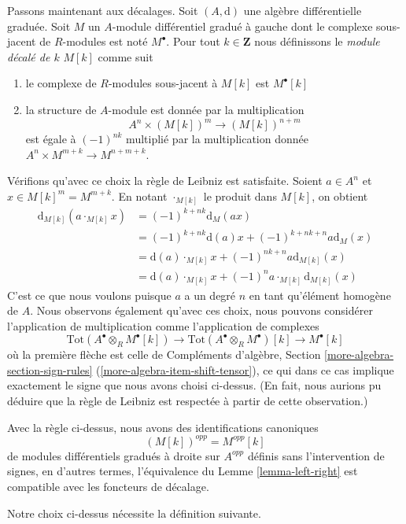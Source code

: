 \noindent
Passons maintenant aux décalages. Soit $(A, \text{d})$ une algèbre différentielle
graduée. Soit $M$ un $A$-module différentiel gradué à gauche dont le complexe
sous-jacent de $R$-modules est noté $M^\bullet$. Pour tout $k \in \mathbf{Z}$ nous
définissons le {\it module décalé de $k$} $M[k]$ comme suit
\begin{enumerate}
\item le complexe de $R$-modules sous-jacent à $M[k]$ est $M^\bullet[k]$
\item la structure de $A$-module est donnée par la multiplication
$$
A^n \times (M[k])^m \longrightarrow (M[k])^{n + m}
$$
est égale à $(-1)^{nk}$ multiplié par la multiplication donnée $A^n \times M^{m +
k} \to M^{n + m + k}$.
\end{enumerate}
Vérifions qu'avec ce choix la règle de Leibniz est satisfaite. Soient $a \in
A^n$ et $x \in M[k]^m = M^{m + k}$. En notant $\cdot_{M[k]}$ le produit dans
$M[k]$, on obtient
\begin{align*}
\text{d}_{M[k]}(a \cdot_{M[k]} x)
& =
(-1)^{k + nk} \text{d}_M(ax) \\
& =
(-1)^{k + nk} \text{d}(a) x + (-1)^{k + nk + n} a \text{d}_M(x) \\
& =
\text{d}(a) \cdot_{M[k]} x + (-1)^{nk + n} a \text{d}_{M[k]}(x) \\
& =
\text{d}(a) \cdot_{M[k]} x + (-1)^n a \cdot_{M[k]} \text{d}_{M[k]}(x)
\end{align*}
C'est ce que nous voulons puisque $a$ a un degré $n$ en tant qu'élément homogène
de $A$. Nous observons également qu'avec ces choix, nous pouvons considérer
l'application de multiplication comme l'application de complexes
$$
\text{Tot}(A^\bullet \otimes_R M^\bullet[k]) \to
\text{Tot}(A^\bullet \otimes_R M^\bullet)[k] \to
M^\bullet[k]
$$
où la première flèche est celle de Compléments d'algèbre, Section
\ref{more-algebra-section-sign-rules} (\ref{more-algebra-item-shift-tensor}), ce
qui dans ce cas implique exactement le signe que nous avons choisi ci-dessus. (En
fait, nous aurions pu déduire que la règle de Leibniz est respectée à partir de
cette observation.)

\medskip\noindent
Avec la règle ci-dessus, nous avons des identifications canoniques
$$
(M[k])^{opp} = M^{opp}[k]
$$
de modules différentiels gradués à droite sur $A^{opp}$ définis sans l'intervention de
signes, en d'autres termes, l'équivalence du Lemme \ref{lemma-left-right} est
compatible avec les foncteurs de décalage.

\medskip\noindent
Notre choix ci-dessus nécessite la définition suivante.

